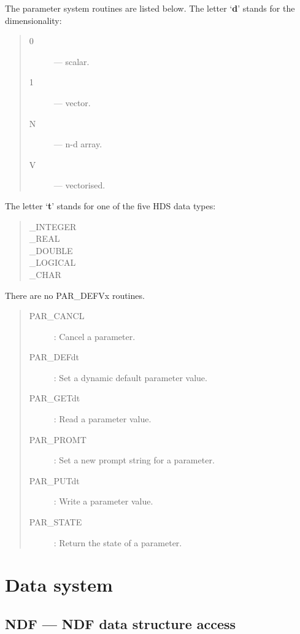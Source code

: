 The parameter system routines are listed below.
The letter `{\bf d}' stands for the dimensionality:
\begin{quote}
\begin{description}
\item [0] --- scalar.
\item [1] --- vector.
\item [N] --- n-d array.
\item [V] --- vectorised.
\end{description}
\end{quote}
The letter `{\bf t}' stands for one of the five HDS data types:
\begin{quote}
\begin{description}
\item [\_INTEGER]
\item [\_REAL]
\item [\_DOUBLE]
\item [\_LOGICAL]
\item [\_CHAR]
\end{description}
\end{quote}
There are no PAR\_DEFVx routines.
\begin{quote}
\begin{description}
\item [PAR\_CANCL] : Cancel a parameter.
\item [PAR\_DEFdt] : Set a dynamic default parameter value.
\item [PAR\_GETdt] : Read a parameter value.
\item [PAR\_PROMT] : Set a new prompt string for a parameter.
\item [PAR\_PUTdt] : Write a parameter value.
\item [PAR\_STATE] : Return the state of a parameter.
\end{description}
\end{quote}

\newpage

\section{Data system}

\subsection{NDF --- NDF data structure access} 
\label{R_NDF}

\vspace{-9mm}

